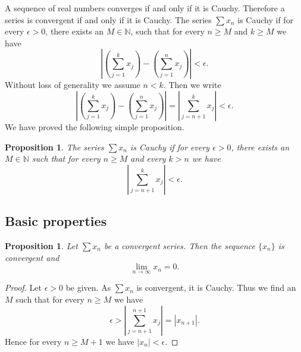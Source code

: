 \documentclass[12pt]{book}
\newcommand{\abs}[1]{\left\lvert {#1} \right\rvert}
\newcommand{\N}{{\mathbb{N}}}
\theoremstyle{plain}
\newtheorem{prop}[thm]{Proposition}
\theoremstyle{remark}
\theoremstyle{definition}
\theoremstyle{exercise}
\theoremstyle{example}
\begin{document}
A sequence of real numbers converges if and only if it is
Cauchy.  Therefore a series is convergent if and only if it is Cauchy.
The series $\sum x_n$ is Cauchy if for every $\epsilon > 0$,
there exists an $M \in \N$, such that for every $n \geq M$
and $k \geq M$ we have
\begin{equation*}
\abs{ \left( \sum_{j=1}^k x_j \right) - \left( \sum_{j=1}^n x_j \right) }
< \epsilon .
\end{equation*}
Without loss of generality we assume $n < k$.  Then we write
\begin{equation*}
\abs{ \left( \sum_{j=1}^k x_j \right) - \left( \sum_{j=1}^n x_j \right) }
=
\abs{ \sum_{j={n+1}}^k x_j }
< \epsilon .
\end{equation*}
We have proved the following simple proposition.

\begin{prop} \label{prop:cachyser}
The series $\sum x_n$ is Cauchy if for every $\epsilon > 0$, 
there exists an $M \in \N$ such that for every $n \geq M$
and every $k > n$ we have
\begin{equation*}
\abs{ \sum_{j={n+1}}^k x_j }
< \epsilon .
\end{equation*}
\end{prop}

\subsection{Basic properties}


\begin{prop}
Let $\sum x_n$ be a convergent series.  Then
the sequence $\{ x_n \}$ is convergent and
\begin{equation*}
\lim_{n\to\infty} x_n = 0.
\end{equation*}
\end{prop}

\begin{proof}
Let $\epsilon > 0$ be given.  As $\sum x_n$ is convergent, it is Cauchy.
Thus we find an $M$ such that for every $n \geq M$ we have
\begin{equation*}
\epsilon > 
\abs{ \sum_{j={n+1}}^{n+1} x_j }
=
\abs{ x_{n+1} } .
\end{equation*}
Hence for every $n \geq M+1$ we have $\abs{x_{n}} < \epsilon$.
\end{proof}
\end{document}

